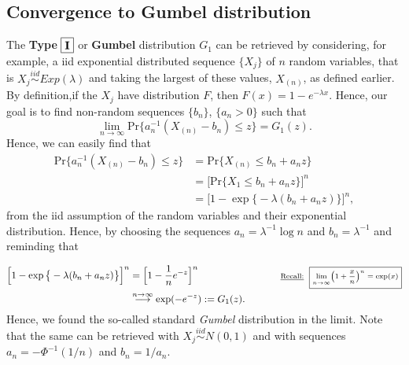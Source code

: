 \subsection*{Convergence to Gumbel distribution}
The \textbf{Type}  $\boxed{\textbf{\text{I}}}$ or \textbf{Gumbel} distribution $G_1$ can be retrieved by considering, for example,  a iid exponential distributed sequence $\{X_j\}$ of $n$ random variables, that is $X_j\stackrel{iid}{\sim}Exp(\lambda)$ and taking the largest of these values, $X_{(n)}$, as defined earlier. By definition,if the $X_j$ have distribution $F$, then $F(x)=1-e^{-\lambda x}$. Hence, our goal is to find non-random sequences $\{b_n\}$, $\{a_n>0\}$ such that 
\begin{equation}
\displaystyle{\lim_{n \to \infty}}\text{Pr}\Big\{ a_n^{-1}(X_{(n)}-b_n)\leq z\Big\}=G_1(z).
\end{equation}
Hence, we can easily find that
\begin{equation*}
\begin{aligned}
\text{Pr}\Big\{ a_n^{-1}(X_{(n)}-b_n)\leq z\Big\}
&=\text{Pr}\big\{X_{(n)}\leq b_n+a_nz\big\} \\ &=\Big[\text{Pr}\{X_1\leq b_n+a_nz\}\Big]^n \\
&=\Big[1-\exp\big\{-\lambda(b_n+a_nz)\big\}\Big]^n,
\end{aligned}
\end{equation*}
from the iid assumption of the random variables and their exponential distribution.
Hence, by choosing  the sequences $a_n=\lambda^{-1}\log n$ and $b_n=\lambda^{-1}$ and reminding that%


\begin{equation*}
\begin{aligned}
\Big[1-\exp\big\{-\lambda(b_n+a_nz)\big\}\Big]^n 
& = \Big[1-\frac{1}{n}e^{-z}\Big]^n \ \ \ \ \ \ \ \ \ \ \ \ \ \ \ \ \ \ \ \ \ \ \ \ \ \scriptsize\text{\underline{Recall:}} \ \ %
\boxed{\scriptsize\displaystyle{\lim_{n \to \infty}}\Big(1+\frac{x}{n}\Big)^n=\exp(x)} \\
& \stackrel{n\to\infty}{\longrightarrow} \exp(-e^{-z}):=G_1(z).
\end{aligned}
\end{equation*}
Hence, we found the so-called standard \emph{Gumbel} distribution in the limit. 
Note that the same can be retrieved with $X_j\stackrel{iid}{\sim}N(0,1)$ and with sequences $a_n=-\Phi^{-1}(1/n)$ and $b_n=1/a_n$. 

